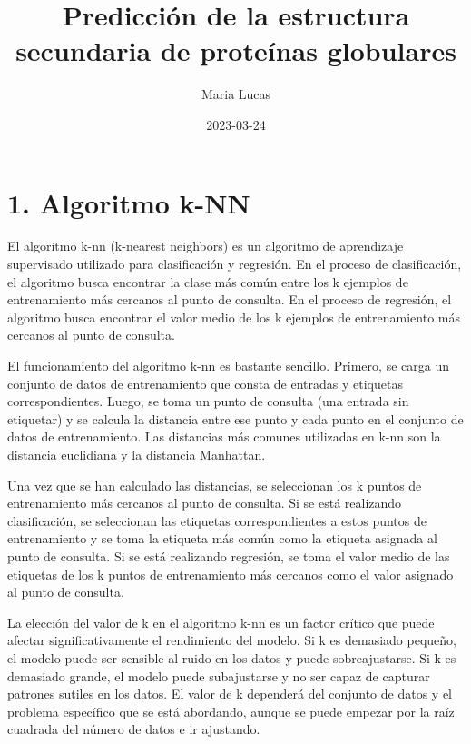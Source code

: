 \documentclass[
]{article}
\title{Predicción de la estructura secundaria de proteínas globulares}
\author{Maria Lucas}
\date{2023-03-24}
\begin{document}
\maketitle

{
\setcounter{tocdepth}{4}
\tableofcontents
}
\newpage

\hypertarget{algoritmo-k-nn}{%
\section{1. Algoritmo k-NN}\label{algoritmo-k-nn}}

El algoritmo k-nn (k-nearest neighbors) es un algoritmo de aprendizaje
supervisado utilizado para clasificación y regresión. En el proceso de
clasificación, el algoritmo busca encontrar la clase más común entre los
k ejemplos de entrenamiento más cercanos al punto de consulta. En el
proceso de regresión, el algoritmo busca encontrar el valor medio de los
k ejemplos de entrenamiento más cercanos al punto de consulta.

El funcionamiento del algoritmo k-nn es bastante sencillo. Primero, se
carga un conjunto de datos de entrenamiento que consta de entradas y
etiquetas correspondientes. Luego, se toma un punto de consulta (una
entrada sin etiquetar) y se calcula la distancia entre ese punto y cada
punto en el conjunto de datos de entrenamiento. Las distancias más
comunes utilizadas en k-nn son la distancia euclidiana y la distancia
Manhattan.

Una vez que se han calculado las distancias, se seleccionan los k puntos
de entrenamiento más cercanos al punto de consulta. Si se está
realizando clasificación, se seleccionan las etiquetas correspondientes
a estos puntos de entrenamiento y se toma la etiqueta más común como la
etiqueta asignada al punto de consulta. Si se está realizando regresión,
se toma el valor medio de las etiquetas de los k puntos de entrenamiento
más cercanos como el valor asignado al punto de consulta.

La elección del valor de k en el algoritmo k-nn es un factor crítico que
puede afectar significativamente el rendimiento del modelo. Si k es
demasiado pequeño, el modelo puede ser sensible al ruido en los datos y
puede sobreajustarse. Si k es demasiado grande, el modelo puede
subajustarse y no ser capaz de capturar patrones sutiles en los datos.
El valor de k dependerá del conjunto de datos y el problema específico
que se está abordando, aunque se puede empezar por la raíz cuadrada del
número de datos e ir ajustando.
\end{document}
